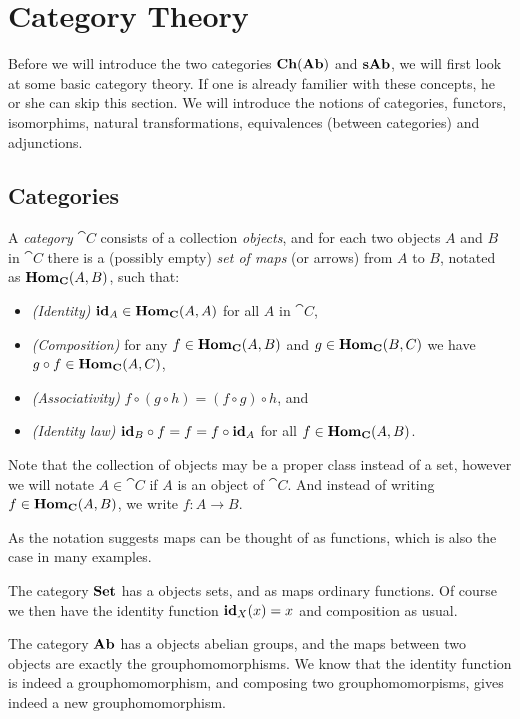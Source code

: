\section{Category Theory}
\label{sec:Category Theory}
Before we will introduce the two categories $\mathbf{Ch}(\mathbf{Ab})$ and $\mathbf{sAb}$, we will first look at some basic category theory. If one is already familier with these concepts, he or she can skip this section. We will introduce the notions of categories, functors, isomorphims, natural transformations, equivalences (between categories) and adjunctions.

\subsection{Categories}
\begin{definition}
	A \emph{category} $\cat{C}$ consists of a collection \emph{objects}, and for each two objects $A$ and $B$ in $\cat{C}$ there is a (possibly empty) \emph{set of maps} (or arrows) from $A$ to $B$, notated as $\mathbf{Hom}_{\mathbf{C}}(A, B)$, such that:
	\begin{itemize}
		\item \emph{(Identity)}
			$\mathbf{id}_A \in \mathbf{Hom}_{\mathbf{C}}(A, A)$ for all $A$ in $\cat{C}$,
		\item \emph{(Composition)}
			for any $f \in \mathbf{Hom}_{\mathbf{C}}(A, B)$ and $g \in \mathbf{Hom}_{\mathbf{C}}(B, C)$ we have $g \circ f \in \mathbf{Hom}_{\mathbf{C}}(A, C)$,
		\item \emph{(Associativity)}
			$f \circ (g \circ h) = (f \circ g) \circ h$, and
		\item \emph{(Identity law)}
			$\mathbf{id}_B \circ f = f = f \circ \mathbf{id}_A$ for all $f \in \mathbf{Hom}_{\mathbf{C}}(A, B)$.
	\end{itemize}
\end{definition}

Note that the collection of objects may be a proper class instead of a set, however we will notate $A \in \cat{C}$ if $A$ is an object of $\cat{C}$. And instead of writing $f \in \mathbf{Hom}_{\mathbf{C}}(A, B)$, we write $f: A \to B$.

As the notation suggests maps can be thought of as functions, which is also the case in many examples.

\begin{example}
	The category $\mathbf{Set}$ has a objects sets, and as maps ordinary functions. Of course we then have the identity function $\mathbf{id}_X(x) = x$ and composition as usual.
\end{example}
\begin{example}
	The category $\mathbf{Ab}$ has a objects abelian groups, and the maps between two objects are exactly the grouphomomorphisms. We know that the identity function is indeed a grouphomomorphism, and composing two grouphomomorpisms, gives indeed a new grouphomomorphism.
\end{example}

